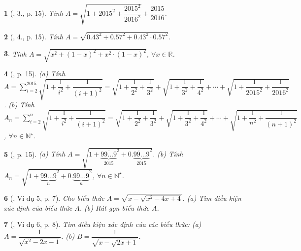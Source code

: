 \documentclass{article}
\newtheorem{baitoan}{}%
\begin{document}
\begin{baitoan}[\cite{Binh_boi_duong_Toan_9_tap_1}, 3., p. 15]
	Tính $A = \sqrt{1 + 2015^2 + \dfrac{2015^2}{2016^2}} + \dfrac{2015}{2016}$.
\end{baitoan}

\begin{baitoan}[\cite{Binh_boi_duong_Toan_9_tap_1}, 4., p. 15]
	Tính $A = \sqrt{0.43^2 + 0.57^2 + 0.43^2\cdot0.57^2}$.
\end{baitoan}

\begin{baitoan}
	Tính $A = \sqrt{x^2 + (1 - x)^2 + x^2\cdot(1 - x)^2}$, $\forall x\in\mathbb{R}$.
\end{baitoan}

\begin{baitoan}[\cite{Binh_boi_duong_Toan_9_tap_1}, p. 15]
	(a) Tính $A = \sum_{i=2}^{2015} \sqrt{1 + \dfrac{1}{i^2} + \dfrac{1}{(i + 1)^2}} = \sqrt{1 + \dfrac{1}{2^2} + \dfrac{1}{3^2}} + \sqrt{1 + \dfrac{1}{3^2} + \dfrac{1}{4^2}} + \cdots + \sqrt{1 + \dfrac{1}{2015^2} + \dfrac{1}{2016^2}}$. (b) Tính $A_n = \sum_{i=2}^n \sqrt{1 + \dfrac{1}{i^2} + \dfrac{1}{(i + 1)^2}} = \sqrt{1 + \dfrac{1}{2^2} + \dfrac{1}{3^2}} + \sqrt{1 + \dfrac{1}{3^2} + \dfrac{1}{4^2}} + \cdots + \sqrt{1 + \dfrac{1}{n^2} + \dfrac{1}{(n + 1)^2}}$, $\forall n\in\mathbb{N}^\star$.
\end{baitoan}

\begin{baitoan}[\cite{Binh_boi_duong_Toan_9_tap_1}, p. 15]
	(a) Tính $A = \sqrt{1 + \overline{\underbrace{99\ldots9}_{2015}}^2 + \overline{0.\underbrace{99\ldots9}_{2015}}^2}$. (b) Tính $A_n = \sqrt{1 + \overline{\underbrace{99\ldots9}_n}^2 + \overline{0.\underbrace{99\ldots9}_n}^2}$, $\forall n\in\mathbb{N}^\star$.
\end{baitoan}


\begin{baitoan}[\cite{Binh_Toan_9_tap_1}, Ví dụ 5, p. 7]
	Cho biểu thức $A = \sqrt{x - \sqrt{x^2 - 4x + 4}}$. (a) Tìm điều kiện xác định của biểu thức $A$. (b) Rút gọn biểu thức $A$.
\end{baitoan}

\begin{baitoan}[\cite{Binh_Toan_9_tap_1}, Ví dụ 6, p. 8]
	Tìm điều kiện xác định của các biểu thức: (a) $A = \dfrac{1}{\sqrt{x^2 - 2x - 1}}$. (b) $B = \dfrac{1}{\sqrt{x - \sqrt{2x + 1}}}$.
\end{baitoan}
\end{document}
